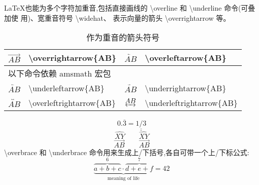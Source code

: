 \documentclass[a4paper]{ctexart}
\begin{document}
    \LaTeX 也能为多个字符加重音,包括直接画线的 \textbackslash overline 和 %
    \textbackslash underline 命令(可叠加使 用)、宽重音符号 \textbackslash widehat、%
    表示向量的箭头 \textbackslash overrightarrow 等。\par
    \begin{table}[H]
        \centering
        \caption{作为重音的箭头符号}
        \begin{tabular}{clcl}
            \toprule
            $\overrightarrow{AB}$           & \textbackslash overrightarrow\{AB\}           &
            $\overleftarrow{AB}$            & \textbackslash overleftarrow\{AB\}            \\
            \midrule
            \multicolumn{4}{l}{以下命令依赖 amsmath 宏包}\\
            $\underleftarrow{AB}$           & \textbackslash underleftarrow\{AB\}           &
            $\underrightarrow{AB}$          & \textbackslash underrightarrow\{AB\}          \\
            $\overleftrightarrow{AB}$       & \textbackslash overleftrightarrow\{AB\}       &
            $\underleftrightarrow{AB}$      & \textbackslash underleftrightarrow\{AB\}      \\
            \bottomrule
        \end{tabular}
    \end{table}
    \[0.\overline{3} = \underline{\underline{1/3}} \]
    \[\hat{XY} \qquad \widehat{XY} \]
    \[\vec{AB} \qquad \overrightarrow{AB} \]
    \textbackslash overbrace 和 \textbackslash underbrace 命令用来生成上/下括号,各自可带一个上/下标公式:
    \[
        \underbrace{\overbrace{a + b + c}^6 \cdot 
                    \overbrace{d + e + f}^7
                    }_\text{meaning of life} = 
        42
    \]
\end{document}
